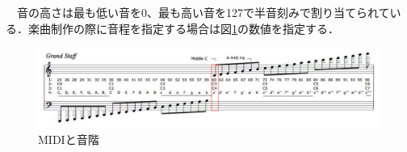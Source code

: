 　音の高さは最も低い音を0、最も高い音を127で半音刻みで割り当てられている．楽曲制作の際に音程を指定する場合は図\ref{fig:MIDIと音階}の数値を指定する．
\begin{figure}[h]
    \begin{screen}
    \begin{center}
        \includegraphics[scale=0.45,clip]{./img/midi2.png}
        \caption{MIDIと音階}
        \label{fig:MIDIと音階}
    \end{center}
    \end{screen}
\end{figure}
\newpage
